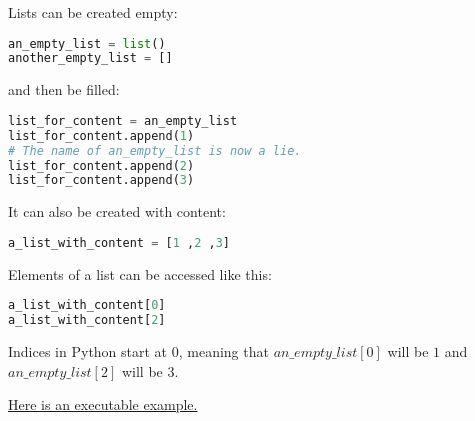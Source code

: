 \documentclass{article}
\begin{document}
Lists can be created empty:

\begin{lstlisting}[language=Python]
an_empty_list = list()
another_empty_list = []
\end{lstlisting}

and then be filled:

\begin{lstlisting}[language=Python]
list_for_content = an_empty_list
list_for_content.append(1)
# The name of an_empty_list is now a lie.
list_for_content.append(2)
list_for_content.append(3)
\end{lstlisting}

It can also be created with content:

\begin{lstlisting}[language=Python]
a_list_with_content = [1 ,2 ,3]
\end{lstlisting}

Elements of a list can be accessed like this:

\begin{lstlisting}[language=Python]
a_list_with_content[0]
a_list_with_content[2]
\end{lstlisting}

Indices in Python start at 0, meaning that
$an\_empty\_list[0]$ will be $1$ and $an\_empty\_list[2]$
will be 3.

\href{
    http://pythontutor.com/visualize.html\#code=an\_empty\_list\%20\%3D\%20list\%28\%29\%0Aanother\_empty\_list\%20\%3D\%20\%5B\%5D\%0A\%0Alist\_for\_content\%20\%3D\%20an\_empty\_list\%0Alist\_for\_content.append\%281\%29\%0A\%23\%20The\%20name\%20of\%20an\_empty\_list\%20is\%20now\%20a\%20lie.\%0Alist\_for\_content.append\%282\%29\%0Alist\_for\_content.append\%283\%29\%0A\%0Aa\_list\_with\_content\%20\%3D\%20\%5B1\%20,2\%20,3\%5D\%0A\%0Aprint\%28an\_empty\_list\%29\%0Aprint\%28another\_empty\_list\%29\%0Aprint\%28list\_for\_content\%29\%0Aprint\%28a\_list\_with\_content\%29\%0A\%0Aprint\%28an\_empty\_list\%5B0\%5D\%29\%0Aprint\%28an\_empty\_list\%5B2\%5D\%29\&cumulative=false\&curInstr=13\&heapPrimitives=nevernest\&mode=display\&origin=opt-frontend.js\&py=3\&rawInputLstJSON=\%5B\%5D\&textReferences=false
    }{Here is an executable example.}



\end{document}
